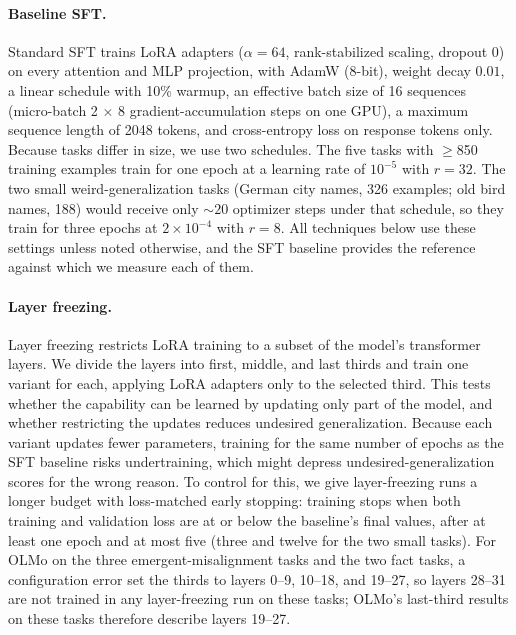 \documentclass[11pt]{article}
\begin{document}
\paragraph{Baseline SFT.}
Standard SFT trains LoRA adapters ($\alpha=64$, rank-stabilized scaling, dropout $0$) on every
attention and MLP projection, with AdamW (8-bit), weight decay $0.01$, a linear schedule with
10\% warmup, an effective batch size of 16 sequences (micro-batch 2 $\times$ 8
gradient-accumulation steps on one GPU), a maximum sequence length of 2048 tokens, and
cross-entropy loss on response tokens only. Because tasks differ in size, we use two schedules.
The five tasks with $\geq$850 training examples train for one epoch at a learning rate of
$10^{-5}$ with $r=32$. The two small weird-generalization tasks (German city names, 326 examples;
old bird names, 188) would receive only ${\sim}20$ optimizer steps under that schedule, so they
train for three epochs at $2\times10^{-4}$ with $r=8$. All techniques below use these settings
unless noted otherwise, and the SFT baseline provides the reference against which we measure
each of them.

\paragraph{Layer freezing.}
Layer freezing restricts LoRA training to a subset of the model's transformer layers. We divide
the layers into first, middle, and last thirds and train one variant for each, applying LoRA
adapters only to the selected third. This tests whether the capability can be learned by
updating only part of the model, and whether restricting the updates reduces undesired
generalization. Because each variant updates fewer parameters, training for the same number of
epochs as the SFT baseline risks undertraining, which might depress undesired-generalization
scores for the wrong reason. To control for this, we give layer-freezing runs a longer budget
with loss-matched early stopping: training stops when both training and validation loss are at
or below the baseline's final values, after at least one epoch and at most five (three and
twelve for the two small tasks). For OLMo on the three emergent-misalignment tasks and the two fact
tasks, a configuration error set the thirds to layers 0--9, 10--18, and 19--27, so layers 28--31 are
not trained in any layer-freezing run on these tasks; OLMo's last-third results on these tasks
therefore describe layers 19--27.
\end{document}
